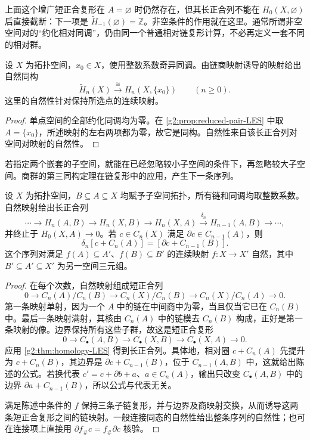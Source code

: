 上面这个增广短正合复形在 \(A=\varnothing\) 时仍然存在，但其长正合列不能在 \(H_0(X,\varnothing)\) 后直接截断：下一项是 \(\widetilde H_{-1}(\varnothing)=\mathbb Z\)。非空条件的作用就在这里。通常所谓非空空间对的“约化相对同调”，仍由同一个普通相对链复形计算，不必再定义一套不同的相对群。

\begin{corollary}\label{g2:cor:reduced-relative-point}
	设 \(X\) 为拓扑空间，\(x_0\in X\)，使用整数系数奇异同调。由链商映射诱导的映射给出自然同构
	\[
		\widetilde H_n(X)\xrightarrow{\ \cong\ }H_n(X,\{x_0\})
		\qquad(n\ge0).
	\]
	这里的自然性针对保持所选点的连续映射。
\end{corollary}
\begin{proof}
	单点空间的全部约化同调均为零。在 \cref{g2:prop:reduced-pair-LES} 中取 \(A=\{x_0\}\)，所述映射的左右两项都为零，故它是同构。自然性来自该长正合列对空间对映射的自然性。
\end{proof}

若指定两个嵌套的子空间，就能在已经忽略较小子空间的条件下，再忽略较大子空间。商群的第三同构定理在链复形中的应用，产生下一条序列。

\begin{theorem}\label{g2:thm:triple-LES}
	设 \(X\) 为拓扑空间，\(B\subseteq A\subseteq X\) 均赋予子空间拓扑，所有链和同调均取整数系数。自然映射给出长正合列
	\[
		\cdots\longrightarrow H_n(A,B)\longrightarrow H_n(X,B)
		\longrightarrow H_n(X,A)
		\xrightarrow{\delta_n}H_{n-1}(A,B)\longrightarrow\cdots,
	\]
	并终止于 \(H_0(X,A)\to0\)。若 \(c\in C_n(X)\) 满足 \(\partial c\in C_{n-1}(A)\)，则
	\[
		\delta_n[c+C_n(A)]
		=[\partial c+C_{n-1}(B)].
	\]
	这个序列对满足 \(f(A)\subseteq A'\)、\(f(B)\subseteq B'\) 的连续映射 \(f:X\to X'\) 自然，其中 \(B'\subseteq A'\subseteq X'\) 为另一空间三元组。
\end{theorem}
\begin{proof}
	在每个次数，自然映射组成短正合列
	\[
		0\longrightarrow C_n(A)/C_n(B)
		\longrightarrow C_n(X)/C_n(B)
		\longrightarrow C_n(X)/C_n(A)\longrightarrow0.
	\]
	第一条映射单射，因为一个 \(A\) 中的链在中间商中为零，当且仅当它已在 \(C_n(B)\) 中。最后一条映射满射，其核由 \(C_n(A)\) 中的链模去 \(C_n(B)\) 构成，正好是第一条映射的像。边界保持所有这些子群，故这是短正合复形
	\[
		0\longrightarrow C_\bullet(A,B)
		\longrightarrow C_\bullet(X,B)
		\longrightarrow C_\bullet(X,A)\longrightarrow0.
	\]
	应用 \cref{g2:thm:homology-LES} 得到长正合列。具体地，相对圈 \(c+C_n(A)\) 先提升为 \(c+C_n(B)\)，其边界是 \(\partial c+C_{n-1}(B)\)，位于 \(C_{n-1}(A,B)\) 中，这就给出陈述的公式。若换代表 \(c'=c+\partial b+a\)、\(a\in C_n(A)\)，输出只改变 \(C_\bullet(A,B)\) 中的边界 \(\partial a+C_{n-1}(B)\)，所以公式与代表无关。

	满足陈述中条件的 \(f\) 保持三条子链复形，并与边界及商映射交换，从而诱导这两条短正合复形之间的链映射。一般连接同态的自然性给出整条序列的自然性；也可在连接项上直接用 \(\partial f_\#c=f_\#\partial c\) 核验。
\end{proof}

